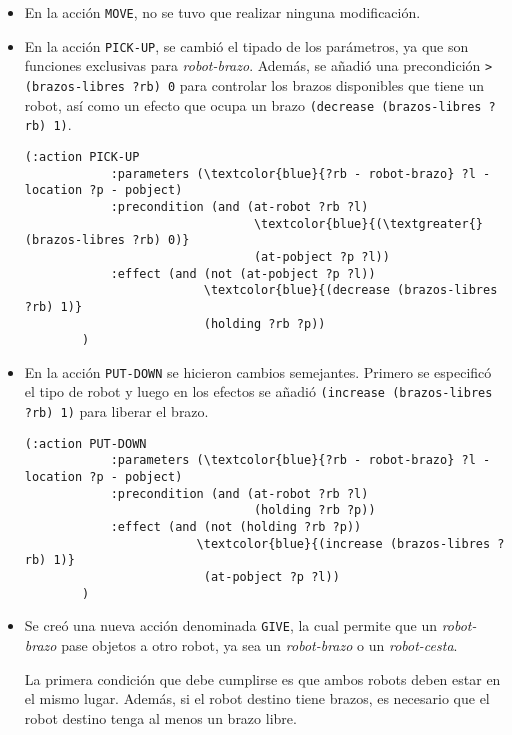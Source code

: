 \documentclass{article}
\begin{document}
 \begin{itemize}
    \item En la acción \texttt{MOVE}, no se tuvo que realizar ninguna modificación.
    \item En la acción \texttt{PICK-UP}, se cambió el tipado de los parámetros, ya que son funciones exclusivas para \textit{robot-brazo}.
    Además, se añadió una precondición \texttt{\textgreater{ (brazos-libres ?rb) 0}} para controlar los brazos disponibles que tiene un robot, así como un efecto que ocupa un brazo \texttt{({decrease (brazos-libres ?rb) 1})}.
    
    \begin{Verbatim}[commandchars=\\\{\}]
        (:action PICK-UP
            :parameters (\textcolor{blue}{?rb - robot-brazo} ?l - location ?p - pobject)
            :precondition (and (at-robot ?rb ?l)
                                \textcolor{blue}{(\textgreater{} (brazos-libres ?rb) 0)}
                                (at-pobject ?p ?l))
            :effect (and (not (at-pobject ?p ?l))
                         \textcolor{blue}{(decrease (brazos-libres ?rb) 1)}
                         (holding ?rb ?p))
        )
    \end{Verbatim}
    
    \item En la acción \texttt{PUT-DOWN} se hicieron cambios semejantes. Primero se especificó el tipo de robot y luego en los efectos se añadió \texttt{(increase (brazos-libres ?rb) 1)} para liberar el brazo.
    
    
    \begin{Verbatim}[commandchars=\\\{\}]
        (:action PUT-DOWN
            :parameters (\textcolor{blue}{?rb - robot-brazo} ?l - location ?p - pobject)
            :precondition (and (at-robot ?rb ?l)
                                (holding ?rb ?p))
            :effect (and (not (holding ?rb ?p))
                        \textcolor{blue}{(increase (brazos-libres ?rb) 1)}
                         (at-pobject ?p ?l))
        )
    \end{Verbatim}

    \item Se creó una nueva acción denominada \texttt{GIVE}, la cual permite que un \textit{robot-brazo} pase objetos a otro robot, 
    ya sea un \textit{robot-brazo} o un \textit{robot-cesta}. 
    
    La primera condición que debe cumplirse es que ambos robots deben estar en el mismo lugar. Además, si el robot destino tiene brazos, es necesario que el robot destino tenga al menos un brazo libre.
    

\end{itemize}
\end{document}
